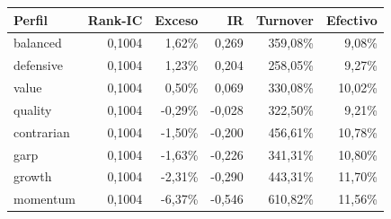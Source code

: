 \begin{tabular}{lrrrrr}
\toprule
Perfil & Rank-IC & Exceso & IR & Turnover & Efectivo \\
\midrule
balanced & 0,1004 & 1,62\% & 0,269 & 359,08\% & 9,08\% \\
defensive & 0,1004 & 1,23\% & 0,204 & 258,05\% & 9,27\% \\
value & 0,1004 & 0,50\% & 0,069 & 330,08\% & 10,02\% \\
quality & 0,1004 & -0,29\% & -0,028 & 322,50\% & 9,21\% \\
contrarian & 0,1004 & -1,50\% & -0,200 & 456,61\% & 10,78\% \\
garp & 0,1004 & -1,63\% & -0,226 & 341,31\% & 10,80\% \\
growth & 0,1004 & -2,31\% & -0,290 & 443,31\% & 11,70\% \\
momentum & 0,1004 & -6,37\% & -0,546 & 610,82\% & 11,56\% \\
\bottomrule
\end{tabular}
